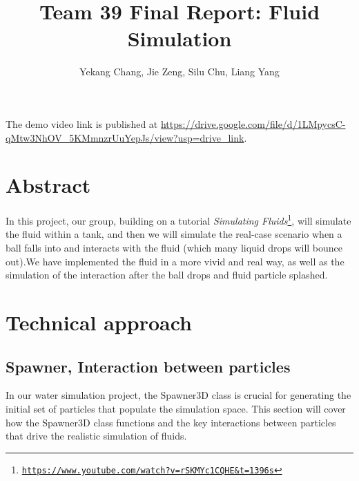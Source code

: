 \documentclass{article}
\title{Team 39 Final Report: Fluid Simulation}
\author{Yekang Chang, Jie Zeng, Silu Chu, Liang Yang}
\newcommand\foothref[3]{#1\footnote{\href{#2}{#3}}}
\begin{document}
\maketitle

The demo video link is published at \url{https://drive.google.com/file/d/1LMpycsC-qMtw3NhOV_5KMmnzrUuYepJs/view?usp=drive_link}.

\section{Abstract}


\hspace{1em} In this project, our group, building on a tutorial \foothref{\textit{Simulating Fluids}}{https://www.youtube.com/watch?v=rSKMYc1CQHE&t=1396s}{\texttt{https://www.youtube.com/watch?v=rSKMYc1CQHE\&t=1396s}},
  will simulate the fluid within a tank, and then we will simulate the real-case scenario when a ball falls into and interacts with the fluid (which many liquid drops will bounce out).We have implemented the fluid in a more vivid and real way, as well as the simulation of the interaction after the ball drops and fluid particle splashed. 

\section{Technical approach}

\subsection{Spawner, Interaction between particles}
 \hspace{1em} In our water simulation project, the Spawner3D class is crucial for generating the initial set of particles that populate the simulation space. This section will cover how the Spawner3D class functions and the key interactions between particles that drive the realistic simulation of fluids.
\end{document}
